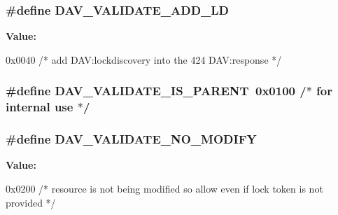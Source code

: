 \subsubsection[{\texorpdfstring{D\+A\+V\+\_\+\+V\+A\+L\+I\+D\+A\+T\+E\+\_\+\+A\+D\+D\+\_\+\+LD}{DAV_VALIDATE_ADD_LD}}]{\setlength{\rightskip}{0pt plus 5cm}\#define D\+A\+V\+\_\+\+V\+A\+L\+I\+D\+A\+T\+E\+\_\+\+A\+D\+D\+\_\+\+LD}\hypertarget{group__MOD__DAV_ga8b16070bf397a37a6c30671967767e55}{}\label{group__MOD__DAV_ga8b16070bf397a37a6c30671967767e55}
{\bfseries Value\+:}
\begin{DoxyCode}
0x0040  \textcolor{comment}{/* add DAV:lockdiscovery into}
\textcolor{comment}{                                           the 424 DAV:response */}
\end{DoxyCode}
\subsubsection[{\texorpdfstring{D\+A\+V\+\_\+\+V\+A\+L\+I\+D\+A\+T\+E\+\_\+\+I\+S\+\_\+\+P\+A\+R\+E\+NT}{DAV_VALIDATE_IS_PARENT}}]{\setlength{\rightskip}{0pt plus 5cm}\#define D\+A\+V\+\_\+\+V\+A\+L\+I\+D\+A\+T\+E\+\_\+\+I\+S\+\_\+\+P\+A\+R\+E\+NT~0x0100  /$\ast$ for internal use $\ast$/}\hypertarget{group__MOD__DAV_gad0e3323306052a3cc35542d73fea1e73}{}\label{group__MOD__DAV_gad0e3323306052a3cc35542d73fea1e73}
\subsubsection[{\texorpdfstring{D\+A\+V\+\_\+\+V\+A\+L\+I\+D\+A\+T\+E\+\_\+\+N\+O\+\_\+\+M\+O\+D\+I\+FY}{DAV_VALIDATE_NO_MODIFY}}]{\setlength{\rightskip}{0pt plus 5cm}\#define D\+A\+V\+\_\+\+V\+A\+L\+I\+D\+A\+T\+E\+\_\+\+N\+O\+\_\+\+M\+O\+D\+I\+FY}\hypertarget{group__MOD__DAV_ga3279e589a23dc97051629161bea150ce}{}\label{group__MOD__DAV_ga3279e589a23dc97051629161bea150ce}
{\bfseries Value\+:}
\begin{DoxyCode}
0x0200  \textcolor{comment}{/* resource is not being modified}
\textcolor{comment}{                                           so allow even if lock token}
\textcolor{comment}{                                           is not provided */}
\end{DoxyCode}
